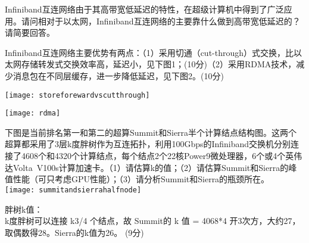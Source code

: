 \documentclass[a4paper, 12pt, answers]{exam}
\begin{document}
\begin{questions}
\question[20]
Infiniband互连网络由于其高带宽低延迟的特性，在超级计算机中得到了广泛应用。请问相对于以太网，Infiniband互连网络的主要靠什么做到高带宽低延迟的？请简要回答。 \\

\begin{solution}[10cm]
	Infiniband互连网络主要优势有两点：（1）采用切通（cut-through）式交换，比以太网存储转发式交换效率高，延迟小，见下图1；(10分)（2）采用RDMA技术，减少消息包在不同层缓存，进一步降低延迟，见下图2。(10分)

\centering
\texttt{[image: storeforewardvscutthrough]}


\texttt{[image: rdma]}
\raggedright

\end{solution}


\question[25]
下图是当前排名第一和第二的超算Summit和Sierra半个计算结点结构图。这两个超算都采用了3层k度胖树作为互连拓扑，利用100Gbps的Infiniband交换机分别连接了4608个和4320个计算结点，每个结点2个22核Power9微处理器，6个或4个英伟达Volta~V100s计算加速卡。（1）请估算k的值；（2）请估算Summit和Sierra的峰值性能（可只考虑GPU性能）；（3）请分析Summit和Sierra的瓶颈所在。 \\

\centering
\texttt{[image: summitandsierrahalfnode]}
\raggedright

\begin{solution}[10cm]
	\raggedright
	胖树k值： \\
	k度胖树可以连接 k3/4 个结点，故 Summit的 k 值 = 4068*4 开3次方，大约27，取偶数得28。Sierra的k值为26。 (9分)


\end{solution}
\end{questions}
\end{document}
